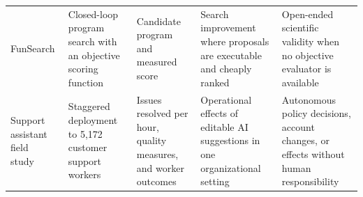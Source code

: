 \begin{table}[!htbp]
\begin{tabularx}{\textwidth}{L{2.35cm}L{2.65cm}L{3.05cm}L{3.15cm}Y}
FunSearch\newline\cite{romeraparedes2024funsearch} & Closed-loop program search with an objective scoring function & Candidate program and measured score & Search improvement where proposals are executable and cheaply ranked & Open-ended scientific validity when no objective evaluator is available \\
Support assistant field study~\cite{brynjolfsson2025generativeaiatwork} & Staggered deployment to 5,172 customer support workers & Issues resolved per hour, quality measures, and worker outcomes & Operational effects of editable AI suggestions in one organizational setting & Autonomous policy decisions, account changes, or effects without human responsibility \\
\bottomrule
\end{tabularx}
\end{table}

